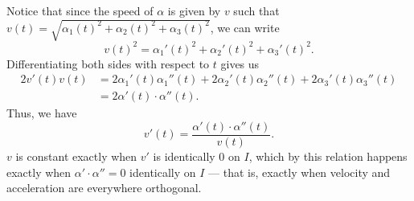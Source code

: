 \documentclass[12 pt, letterpaper]{hmcpset}
\begin{document}
\begin{solution}
	Notice that since the speed of $\alpha$ is given by $v$ such that $v(t) = \sqrt{\alpha_1(t)^2 + \alpha_2(t)^2 + \alpha_3(t)^2}$, we can write
	\[
		v(t)^2 = \alpha_1'(t)^2 + \alpha_2'(t)^2 + \alpha_3'(t)^2.
	\]
	Differentiating both sides with respect to $t$ gives us
	\[
		\begin{split}
			2 v'(t) v(t) & = 2 \alpha_1'(t) \alpha_1''(t) + 2 \alpha_2'(t) \alpha_2''(t) + 2 \alpha_3'(t) \alpha_3''(t) \\
				& = 2 \alpha'(t) \cdot \alpha''(t).
		\end{split}
	\]
	Thus, we have
	\[
		v'(t) = \frac{\alpha'(t) \cdot \alpha''(t)}{v(t)}.
	\]
	$v$ is constant exactly when $v'$ is identically $0$ on $I$, which by this relation happens exactly when $\alpha' \cdot \alpha'' = 0$ identically on $I$ --- that is, exactly when velocity and acceleration are everywhere orthogonal.
\end{solution}
\end{document}
